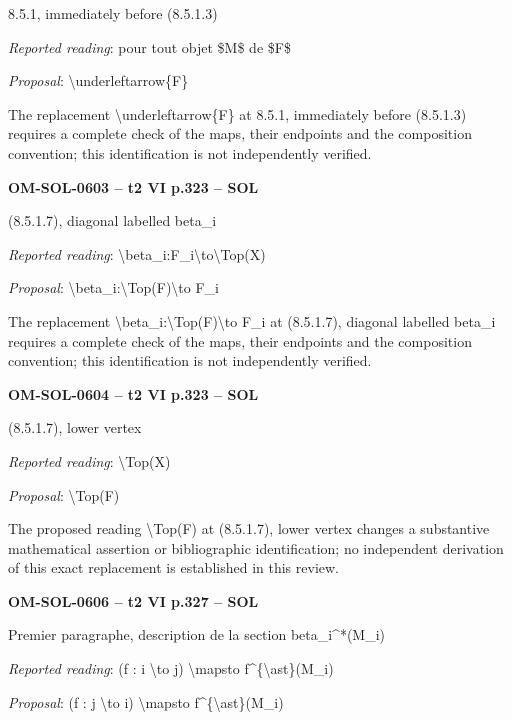 8.5.1, immediately before (8.5.1.3)\par
\emph{Reported reading}: pour tout objet \$M\$ de \$F\$\par
\emph{Proposal}: \textbackslash{}underleftarrow\{F\}\par
The replacement \textbackslash{}underleftarrow\{F\} at 8.5.1, immediately before (8.5.1.3) requires a complete check of the maps, their endpoints and the composition convention; this identification is not independently verified.\par
\par\noindent\textbf{OM-SOL-0603 -- t2 VI p.323 -- SOL}\par
(8.5.1.7), diagonal labelled beta\_i\par
\emph{Reported reading}: \textbackslash{}beta\_i:F\_i\textbackslash{}to\textbackslash{}Top(X)\par
\emph{Proposal}: \textbackslash{}beta\_i:\textbackslash{}Top(F)\textbackslash{}to F\_i\par
The replacement \textbackslash{}beta\_i:\textbackslash{}Top(F)\textbackslash{}to F\_i at (8.5.1.7), diagonal labelled beta\_i requires a complete check of the maps, their endpoints and the composition convention; this identification is not independently verified.\par
\par\noindent\textbf{OM-SOL-0604 -- t2 VI p.323 -- SOL}\par
(8.5.1.7), lower vertex\par
\emph{Reported reading}: \textbackslash{}Top(X)\par
\emph{Proposal}: \textbackslash{}Top(F)\par
The proposed reading \textbackslash{}Top(F) at (8.5.1.7), lower vertex changes a substantive mathematical assertion or bibliographic identification; no independent derivation of this exact replacement is established in this review.\par
\par\noindent\textbf{OM-SOL-0606 -- t2 VI p.327 -- SOL}\par
Premier paragraphe, description de la section beta\_i\textasciicircum{}*(M\_i)\par
\emph{Reported reading}: (f : i \textbackslash{}to j) \textbackslash{}mapsto f\textasciicircum{}\{\textbackslash{}ast\}(M\_i)\par
\emph{Proposal}: (f : j \textbackslash{}to i) \textbackslash{}mapsto f\textasciicircum{}\{\textbackslash{}ast\}(M\_i)\par
